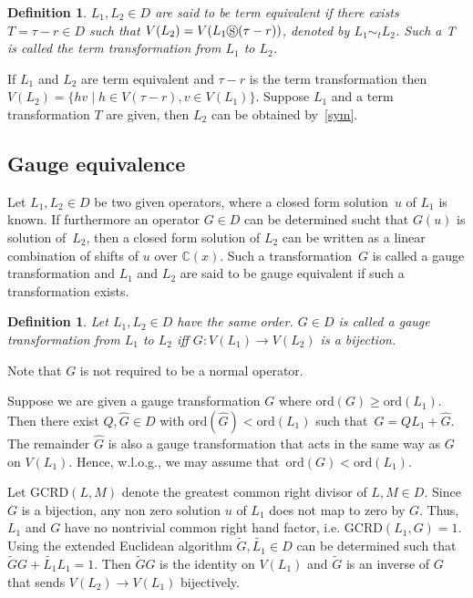 \documentclass{article}
\newtheorem{definition}[theorem]{Definition}
\newcommand{\C}{{\mathbb{C}}} \newcommand{\N}{{\mathbb{N}}}
\newcommand{\ord}{\mathrm{ord}}
\newcommand{\gcrd}{\mathrm{GCRD}}
\newcommand{\cS}{\circledS}
\begin{document}
\begin{definition}
  $L_1, L_2 \in D$ are said to be term equivalent if there exists $T=\tau-r \in D$ such that
  $V(L_2)=V( L_1 \cS (\tau-r))$, denoted by $L_1 \sim_t L_2$. Such a T is called the term
  transformation from $L_1$ to $L_2$.
\end{definition}

If $L_1$ and $L_2$ are term equivalent and $\tau-r $ is the term transformation then
$V(L_2)=\{ h v \mid h \in V(\tau-r), v \in V(L_1) \}$.  Suppose $L_1$ and a term
transformation $T$ are given, then $L_2$ can be obtained by~\eqref{sym}.

\subsection{Gauge equivalence}\label{sec:ge}
Let $L_1,L_2\in D$ be two given operators, where a closed form solution~$u$ of $L_1$ is
known. If furthermore an operator $G\in D$ can be determined sucht that $G(u)$ is solution
of~$L_2$, then a closed form solution of $L_2$ can be written as a linear combination of
shifts of $u$ over $\C(x)$. Such a transformation~$G$ is called a gauge transformation and
$L_1$ and $L_2$ are said to be gauge equivalent if such a transformation exists.




\begin{definition}\label{def:gt}
  Let $L_1, L_2 \in D$ have the same order. $G \in D$ is called a {\em gauge
    transformation} from $L_1$ to $L_2$ iff $G: V(L_1) \rightarrow V(L_2)$ is a bijection.
\end{definition}

Note that $G$ is not required to be a normal operator.  

Suppose we are given a gauge transformation $G$ where $\ord(G) \geq \ord(L_1)$. Then there exist $Q, \hat{G} \in D$
with $\ord(\hat{G}) < \ord(L_1)$ such that~$G=QL_1+\hat{G}$. The remainder $\hat{G}$ is
also a gauge transformation that acts in the same way as $G$ on $V(L_1)$. Hence, 
w.l.o.g., we may assume that~$\ord(G)<\ord(L_1)$.

Let $\gcrd(L, M)$ denote the greatest common right divisor of $L, M \in D$.  
Since $G$ is a bijection, any non zero solution $u$ of $L_1$ does not map to zero by $G$. Thus, $L_1$ and $G$ have no nontrivial common right hand factor, i.e. $\gcrd(L_1, G)=1$. 
Using the extended Euclidean algorithm $\tilde{G},\tilde{L_1}\in D$ can be determined such
that $\tilde{G}G+\tilde{L_1}L_1=1$. Then $\tilde{G}G$ is the identity on $V(L_1)$ and
$\tilde{G}$ is an inverse of $G$ that sends $V(L_2) \rightarrow V(L_1)$ bijectively.
\end{document}
